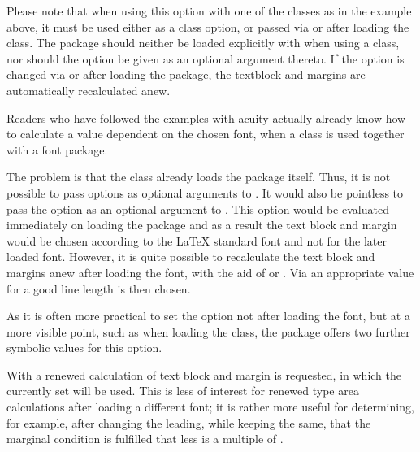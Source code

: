 Please note that when using this option with one of the {\KOMAScript}
classes as in the example above, it must be used either as a class
option, or passed via  or  after
loading the class. The  package should neither be
loaded explicitly with  when using a {\KOMAScript}
class, nor should the option be given as an optional argument
thereto. If the option is changed via  or
 after loading the package, the textblock and
margins are automatically recalculated anew.%
%
\EndIndexGroup


\begin{Declaration}
\end{Declaration}%
Readers who have followed the
examples with acuity actually already know how to calculate a
 value dependent on the chosen font, when a {\KOMAScript}
class is used together with a font package.

\begin{Explain}
  The problem is that the {\KOMAScript} class already loads the
   package itself. Thus, it is not possible to pass
  options as optional arguments to . It would also
  be pointless to pass the  option as an
  optional argument to . This option would be
  evaluated immediately on loading the  package and
  as a result the text block and margin would be chosen according to
  the {\LaTeX} standard font and not for the later loaded
  font. However, it is quite possible to recalculate the text block
  and margins anew after loading the font, with the aid of
   or
  . Via
   an appropriate  value for a good line length
  is then chosen.

  As it is often more practical to set the  option not
  after loading the font, but at a more visible point, such as when
  loading the class, the  package offers two further
  symbolic values for this option.
\end{Explain}

With 
a renewed calculation of text block and margin is requested, in which
the currently set  will be used. This is less of interest for
renewed type area calculations after loading a different font; it is
rather more useful for determining, for example, after changing the
leading, while keeping  the same, that the marginal condition
is fulfilled that  less
 is a multiple of .

